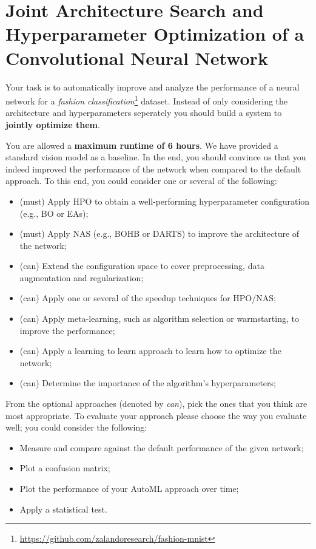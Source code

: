 \documentclass[10pt,a4paper]{article}
\begin{document}
\tfp

	\section*{Joint Architecture Search and Hyperparameter Optimization of a Convolutional Neural Network}

		Your task is to automatically improve and analyze the performance of a neural network for a \emph{fashion classification}\footnote{\url{https://github.com/zalandoresearch/fashion-mnist}} dataset.
		Instead of only considering the architecture and hyperparameters seperately you should build a system to \textbf{jointly optimize them}.

        You are allowed a \textbf{maximum runtime of 6 hours}.
        We have provided a standard vision model as a baseline.
		In the end, you should convince us that you indeed improved the performance of the network when compared to the default approach.
		To this end, you could consider one or several of the following:
		\begin{itemize}
			\item (must) Apply HPO to obtain a well-performing hyperparameter configuration (e.g., BO or EAs);
			\item (must) Apply NAS (e.g., BOHB or DARTS) to improve the architecture of the network;
			\item (can) Extend the configuration space to cover preprocessing, data augmentation and regularization;
			\item (can) Apply one or several of the speedup techniques for HPO/NAS;
			\item (can) Apply meta-learning, such as algorithm selection or warmstarting, to improve the performance;
			\item (can) Apply a learning to learn approach to learn how to optimize the network;
     		\item (can) Determine the importance of the algorithm's hyperparameters;
		\end{itemize}
		\noindent
		From the optional approaches (denoted by \textit{can}), pick the ones that you think are most appropriate.
		To evaluate your approach please choose the way you evaluate well; you could consider the following:
		\begin{itemize}
			\item Measure and compare against the default performance of the given network;
			\item Plot a confusion matrix;
			\item Plot the performance of your AutoML approach over time;
			\item Apply a statistical test.
		\end{itemize}
\end{document}
